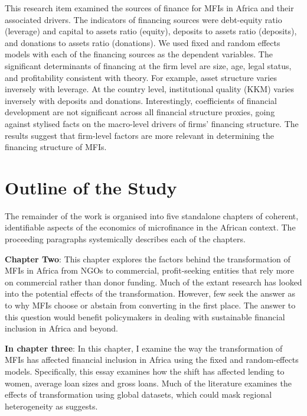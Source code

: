 \documentclass[a4paper, nobind]{templates/ociamthesis}
\begin{document}
This research item examined the sources of finance for MFIs in Africa and their associated drivers. The indicators of financing sources were debt-equity ratio (leverage) and capital to assets ratio (equity), deposits to assets ratio (deposits), and donations to assets ratio (donations). We used fixed and random effects models with each of the financing sources as the dependent variables. The significant determinants of financing at the firm level are size, age, legal status, and profitability consistent with theory. For example, asset structure varies inversely with leverage. At the country level, institutional quality (KKM) varies inversely with deposits and donations. Interestingly, coefficients of financial development are not significant across all financial structure proxies, going against stylised facts on the macro-level drivers of firms' financing structure. The results suggest that firm-level factors are more relevant in determining the financing structure of MFIs.

\hypertarget{outline-of-the-study}{%
\section{Outline of the Study}\label{outline-of-the-study}}

\noindent The remainder of the work is organised into five standalone chapters of coherent, identifiable aspects of the economics of microfinance in the African context. The proceeding paragraphs systemically describes each of the chapters.

\textbf{Chapter Two}: This chapter explores the factors behind the transformation of MFIs in Africa from NGOs to commercial, profit-seeking entities that rely more on commercial rather than donor funding. Much of the extant research has looked into the potential effects of the transformation. However, few seek the answer as to why MFIs choose or abstain from converting in the first place. The answer to this question would benefit policymakers in dealing with sustainable financial inclusion in Africa and beyond.

\textbf{In chapter three}: In this chapter, I examine the way the transformation of MFIs has affected financial inclusion in Africa using the fixed and random-effects models. Specifically, this essay examines how the shift has affected lending to women, average loan sizes and gross loans. Much of the literature examines the effects of transformation using global datasets, which could mask regional heterogeneity as \textcite{d2017ngos} suggests.
\end{document}
